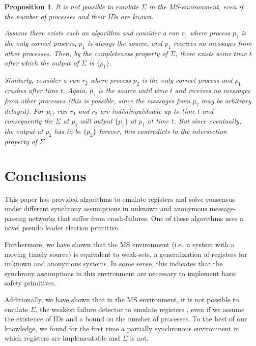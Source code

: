 \documentclass[conference, compsoc]{IEEEtran}
\newtheorem{proposition}{Proposition}
\begin{document}
\begin{proposition}
 It is not possible to emulate $\Sigma$ in the MS-environment, even if the number of processes and their IDs are known.
 \begin{IEEEproof}
  Assume there exists such an algorithm and consider a run $r_1$ where process $p_1$ is the only correct process, $p_1$ is always the source, and $p_1$ receives no messages from other processes. Then, by the completeness property of $\Sigma$, there exists some time $t$ after which the output of $\Sigma$ is $\{p_1\}$.

  Similarly, consider a run $r_2$ where process $p_2$ is the only correct process and $p_1$ crashes after time $t$. Again, $p_1$ is the source until time $t$ and receives no messages from other processes (this is possible, since the messages from $p_2$ may be arbitrary delayed). For $p_1$, run $r_1$ and $r_2$ are indistinguishable up to time $t$ and consequently the $\Sigma$ at $p_1$ will output $\{p_1\}$ at $p_1$ at time $t$. But since eventually, the output at $p_2$ has to be $\{p_2\}$ forever, this contradicts to the intersection property of $\Sigma$.
 
 \end{IEEEproof}
\end{proposition}

\section{Conclusions}

This paper has provided algorithms to emulate registers and solve consensus under different synchrony assumptions in unknown and anonymous message-passing networks that suffer from crash-failures. One of these algorithms uses a novel pseudo leader election primitive. 



Furthermore, we have shown that the MS environment (i.e.~a system with a moving timely source) is equivalent to weak-sets, a generalization of registers for unknown and anonymous systems. In some sense, this indicates that the synchrony assumptions in this environment are necessary to implement basic safety primitives.

Additionally, we have shown that in the MS environment, it is not possible to emulate $\Sigma$, the weakest failure detector to emulate registers \cite{200377/IC}, even if we assume the existence of IDs and a bound on the number of processes. 
To the best of our knowledge, we found for the first time a partially synchronous environment in which registers are implementable and $\Sigma$ is not.








\end{document}
